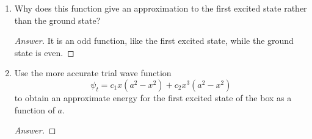 \documentclass[../psets.tex]{subfiles}
\begin{document}
\begin{enumerate}
\begin{enumerate}
        \begin{equation*}
            \psi_t = x(a^2-x^2)
        \end{equation*}
        to obtain an approximate energy for the first excited state of the box as a function of $a$.
        \begin{proof}[Answer]
            We have that
            \begin{align*}
                \int\psi_t^*\hat{H}\psi_t\dd{\tau} &= \int_{-a}^a(a^2x-x^3)\left( -\frac{1}{2}\pdv[2]{x} \right)(a^2x-x^3)\dd{x}\\
                &= \int_{-a}^a(a^2x-x^3)(3x)\dd{x}\\
                &= \int_{-a}^a(3a^2x^2-3x^4)\dd{x}\\
                &= \frac{4a^5}{5}
            \end{align*}
            and that
            \begin{align*}
                \int\psi_t^*\psi_t\dd{\tau} &= \int_{-a}^ax(a^2-x^2)x(a^2-x^2)\dd{x}\\
                &= \int_{-a}^a(a^4x^2-2a^2x^4+x^6)\dd{x}\\
                &= \frac{16}{105}a^7
            \end{align*}
            so
            \begin{align*}
                E_{\psi_t} &= \frac{\int\psi_t^*\hat{H}\psi_t\dd{\tau}}{\int\psi_t^*\psi_t\dd{\tau}}\\
                &= \frac{4a^5/5}{16a^7/105}\\
                \Aboxed{E_{\psi_t} &= \frac{21}{4a^2}\,\si{\atomicunit}}
            \end{align*}
        \end{proof}
        \item Why does this function give an approximation to the first excited state rather than the ground state?
        \begin{proof}[Answer]
            It is an odd function, like the first excited state, while the ground state is even.
        \end{proof}
        \item Use the more accurate trial wave function
        \begin{equation*}
            \psi_t = c_1x(a^2-x^2)+c_2x^3(a^2-x^2)
        \end{equation*}
        to obtain an approximate energy for the first excited state of the box as a function of $a$.
        \begin{proof}[Answer]

\end{proof}
\end{enumerate}
\end{enumerate}
\end{document}
